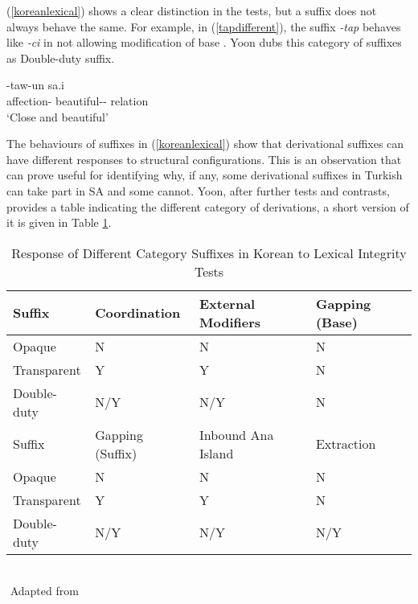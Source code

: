 (\ref{koreanlexical}) shows a clear distinction in the tests, but a suffix does not always behave the same. For example, in (\ref{tapdifferent}), the suffix \textit{-tap} behaves like \textit{-ci} in not allowing modification of base . Yoon dubs this category of suffixes as Double-duty suffix.

\begin{exe}
    \ex \label{tapdifferent}
    -taw-un sa.i \\ 
    affection-{\And} beautiful-{\Der}-{\Rel} relation \\ 
    \glt `Close and beautiful'
\end{exe}

The behaviours of suffixes in (\ref{koreanlexical}) show that derivational suffixes can have different responses to structural configurations. This is an observation that can prove useful for identifying why, if any, some derivational suffixes in Turkish can take part in SA and some cannot. Yoon, after further tests and contrasts, provides a table indicating the different category of derivations, a short version of it is given in Table \ref{tab:korean}.

\begin{table}[hbt!]
    \caption{Response of Different Category Suffixes in Korean to Lexical Integrity Tests}
    \centering
    \begin{tabular}{|l|l|l|l|}
    \hline 
    Suffix      & Coordination & External Modifiers & Gapping (Base) \\ \hline %
    Opaque        & N             & N                 & N            \\ \hline %
    Transparent   & Y             & Y                 & N            \\ \hline %
    Double-duty   & N/Y           & N/Y               & N            \\ \hline \hline%
    
    Suffix      &    Gapping (Suffix)    & Inbound Ana Island    &   Extraction \\ \hline
    Opaque      &    N                   & N                     &   N   \\ \hline 
    Transparent &    Y                   & Y                     &   N \\ \hline 
    Double-duty &    N/Y                 & N/Y                   &  N/Y \\ \hline 
    \end{tabular}\\
    ${}$ \hfill Adapted from \cite{yoon2017lexical}
    \label{tab:korean}
\end{table}

